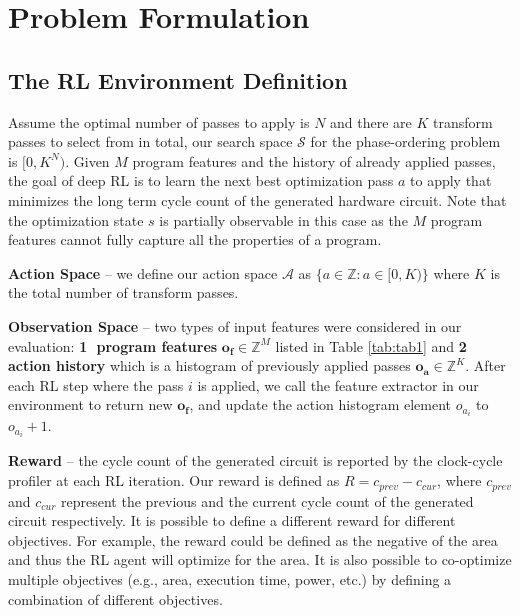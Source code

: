 \section{Problem Formulation}
\label{sec:DRLA}
\subsection{The RL Environment Definition}
\label{subsubsec:conf1}
Assume the optimal number of passes to apply is $N$ and there are $K$ transform passes to select from in total, our search space $\mathcal{S}$ for the phase-ordering problem is $[0, K^N)$. 
Given $M$ program features and the history of already applied passes, the goal of deep RL is to learn the next best optimization pass $a$ to apply that minimizes the long term cycle count of the generated hardware circuit. 
Note that the optimization state $s$ is partially observable in this case as the $M$ program features cannot fully capture all the properties of a program.  

\textbf{Action Space} -- 
we define our action space $\mathcal{A}$ as
$\{a \in \mathbb{Z}: a \in [0, K)\}$ where $K$ is the total number of transform passes.%

\textbf{Observation Space} -- 
two types of input features were considered in our evaluation: 
\textbf{\textcircled{1} program features}  $\mathbf{o_f} \in 
\mathbb{Z}^M$ listed in Table \ref{tab:tab1} and 
\textbf{\textcircled{2} action history} which is a histogram of previously applied passes $\mathbf{o_a} \in \mathbb{Z}^K$. After each RL step where the pass $i$ is applied, we call the feature extractor in our environment to return new $\mathbf{o_f}$, and update the action histogram element $o_{a_i}$ to $o_{a_i} + 1$.  

\textbf{Reward} -- 
the cycle count of the generated circuit is reported by the clock-cycle profiler at each RL iteration. 
Our reward is defined as $R = c_{prev} - c_{cur}$, where $c_{prev}$ and $c_{cur}$ represent the previous and the current cycle count of the generated circuit respectively. It is possible to define a different reward for different objectives. For example, the reward could be defined as the negative of the area and thus the RL agent will optimize for the area. It is also possible to co-optimize multiple objectives (e.g., area, execution time, power, etc.) by defining a combination of different objectives.

